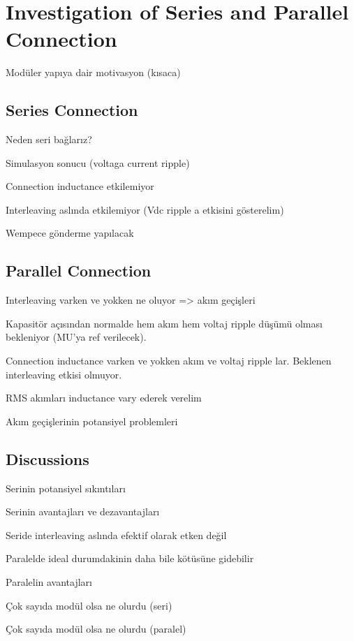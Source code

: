 \section{Investigation of Series and Parallel Connection}\label{sec:SimResults}

Modüler yapıya dair motivasyon (kısaca)

\subsection{Series Connection}
Neden seri bağlarız?

Simulasyon sonucu (voltaga current ripple)

Connection inductance etkilemiyor

Interleaving aslında etkilemiyor (Vdc ripple a etkisini gösterelim)

Wempece gönderme yapılacak

\subsection{Parallel Connection}
Interleaving varken ve yokken ne oluyor => akım geçişleri

Kapasitör açısından normalde hem akım hem voltaj ripple düşümü olması bekleniyor (MU'ya ref verilecek).

Connection inductance varken ve yokken akım ve voltaj ripple lar. Beklenen interleaving etkisi olmuyor.

RMS akımları inductance vary ederek verelim

Akım geçişlerinin potansiyel problemleri

\subsection{Discussions}

Serinin potansiyel sıkıntıları

Serinin avantajları ve dezavantajları

Seride interleaving aslında efektif olarak etken değil

Paralelde ideal durumdakinin daha bile kötüsüne gidebilir

Paralelin avantajları

Çok sayıda modül olsa ne olurdu (seri)

Çok sayıda modül olsa ne olurdu (paralel)
